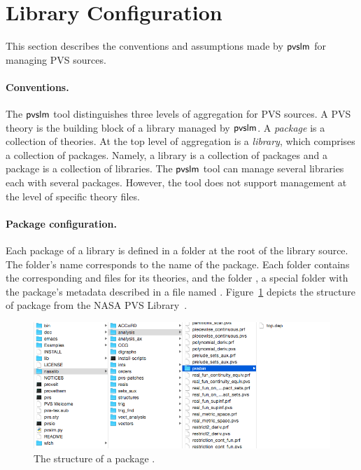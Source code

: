 \section{Library Configuration}
\label{sec.conf}

This section describes the conventions and assumptions made by
$\textsf{pvslm}$ for managing PVS sources.

\paragraph{Conventions.}
The $\textsf{pvslm}$ tool distinguishes three levels of aggregation for PVS
sources. A PVS theory is the building block of a library managed by
$\textsf{pvslm}$. A {\em package} is a collection of theories. At the top
level of aggregation is a {\em library}, which comprises a collection
of packages. Namely, a library is a collection of packages and a
package is a collection of libraries. The $\textsf{pvslm}$ tool can manage
several libraries each with several packages. However, the tool does
not support management at the level of specific theory files.

\paragraph{Package configuration.}
Each package of a library is defined in a folder at the root of the
library source. The folder's name corresponds to the name of the
package. Each folder contains the corresponding  and
 files for its theories, and the folder , a
special folder with the package's metadata described in a file named
. Figure~\ref{fig.package} depicts the structure of
package  from the NASA PVS Library~\cite{nasalib}.

\begin{figure}
  \centering
  \includegraphics[width=13cm]{images/package.png}
  \caption{The structure of a package .}
  \label{fig.package}
\end{figure}

